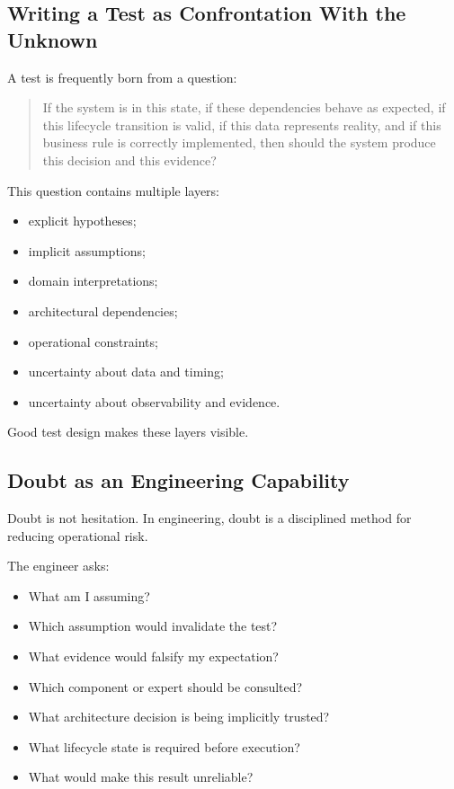 \documentclass[11pt,a4paper]{article}
\begin{document}
\subsection{Writing a Test as Confrontation With the Unknown}

A test is frequently born from a question:

\begin{quote}
If the system is in this state, if these dependencies behave as expected, if this lifecycle transition is valid, if this data represents reality, and if this business rule is correctly implemented, then should the system produce this decision and this evidence?
\end{quote}

This question contains multiple layers:
\begin{itemize}
\item explicit hypotheses;
\item implicit assumptions;
\item domain interpretations;
\item architectural dependencies;
\item operational constraints;
\item uncertainty about data and timing;
\item uncertainty about observability and evidence.
\end{itemize}

Good test design makes these layers visible.

\subsection{Doubt as an Engineering Capability}

Doubt is not hesitation. In engineering, doubt is a disciplined method for reducing operational risk.

The engineer asks:
\begin{itemize}
\item What am I assuming?
\item Which assumption would invalidate the test?
\item What evidence would falsify my expectation?
\item Which component or expert should be consulted?
\item What architecture decision is being implicitly trusted?
\item What lifecycle state is required before execution?
\item What would make this result unreliable?
\end{itemize}
\end{document}
